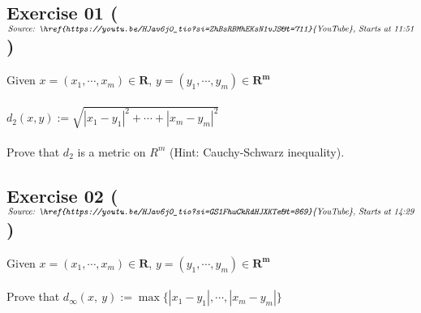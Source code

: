 \subsection*{Exercise 01 ($\textit{Source: \href{https://youtu.be/HJav6j0_tio?si=ZhBsRBMhEKsN1vJS&t=711}{YouTube}, Starts at 11:51}$)}
Given $x = (x_1, \cdots, x_m) \in \mathbf{R}$, $y = (y_1, \cdots, y_m) \in \mathbf{R^{m}}$ \\\\
$d_2(x, y) := \sqrt{|x_1 - y_1|^{2} + \cdots + |x_m - y_m|^{2}}$                           \\\\
Prove that $d_2$ is a metric on $R^m$ (Hint: Cauchy-Schwarz inequality).



\subsection*{Exercise 02 ($\textit{Source: \href{https://youtu.be/HJav6j0_tio?si=GS1FhwCkRdHJXKTe&t=869}{YouTube}, Starts at 14:29}$)}
Given $x = (x_1, \cdots, x_m) \in \mathbf{R}$, $y = (y_1, \cdots, y_m) \in \mathbf{R^{m}}$ \\\\
Prove that $d_{\infty}(x,\ y) := \max\{|x_1 - y_1|, \cdots, |x_m - y_m|\}$

